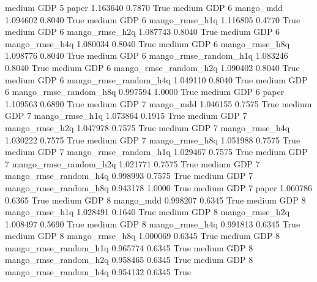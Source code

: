     medium      GDP                 5                 paper   1.163640      0.7870    True
    medium      GDP                 6             mango_mdd   1.094602      0.8040    True
    medium      GDP                 6        mango_rmse_h1q   1.116805      0.4770    True
    medium      GDP                 6        mango_rmse_h2q   1.087743      0.8040    True
    medium      GDP                 6        mango_rmse_h4q   1.080034      0.8040    True
    medium      GDP                 6        mango_rmse_h8q   1.098776      0.8040    True
    medium      GDP                 6 mango_rmse_random_h1q   1.083246      0.8040    True
    medium      GDP                 6 mango_rmse_random_h2q   1.090402      0.8040    True
    medium      GDP                 6 mango_rmse_random_h4q   1.049110      0.8040    True
    medium      GDP                 6 mango_rmse_random_h8q   0.997594      1.0000    True
    medium      GDP                 6                 paper   1.109563      0.6890    True
    medium      GDP                 7             mango_mdd   1.046155      0.7575    True
    medium      GDP                 7        mango_rmse_h1q   1.073864      0.1915    True
    medium      GDP                 7        mango_rmse_h2q   1.047978      0.7575    True
    medium      GDP                 7        mango_rmse_h4q   1.030222      0.7575    True
    medium      GDP                 7        mango_rmse_h8q   1.051988      0.7575    True
    medium      GDP                 7 mango_rmse_random_h1q   1.029467      0.7575    True
    medium      GDP                 7 mango_rmse_random_h2q   1.021771      0.7575    True
    medium      GDP                 7 mango_rmse_random_h4q   0.998993      0.7575    True
    medium      GDP                 7 mango_rmse_random_h8q   0.943178      1.0000    True
    medium      GDP                 7                 paper   1.060786      0.6365    True
    medium      GDP                 8             mango_mdd   0.998207      0.6345    True
    medium      GDP                 8        mango_rmse_h1q   1.028491      0.1640    True
    medium      GDP                 8        mango_rmse_h2q   1.008497      0.5690    True
    medium      GDP                 8        mango_rmse_h4q   0.991813      0.6345    True
    medium      GDP                 8        mango_rmse_h8q   1.000069      0.6345    True
    medium      GDP                 8 mango_rmse_random_h1q   0.965774      0.6345    True
    medium      GDP                 8 mango_rmse_random_h2q   0.958465      0.6345    True
    medium      GDP                 8 mango_rmse_random_h4q   0.954132      0.6345    True
